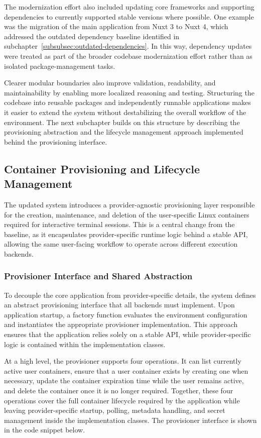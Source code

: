 The modernization effort also included updating core frameworks and supporting dependencies to currently supported stable versions where possible.
One example was the migration of the main application from Nuxt 3 to Nuxt 4, which addressed the outdated dependency baseline identified in subchapter~\ref{subsubsec:outdated-dependencies}.
In this way, dependency updates were treated as part of the broader codebase modernization effort rather than as isolated package-management tasks.

Clearer modular boundaries also improve validation, readability, and maintainability by enabling more localized reasoning and testing.
Structuring the codebase into reusable packages and independently runnable applications makes it easier to extend the system without destabilizing the overall workflow of the environment.
The next subchapter builds on this structure by describing the provisioning abstraction and the lifecycle management approach implemented behind the provisioning interface.

\subsection{Container Provisioning and Lifecycle Management} \label{subsec:container-provisioning-and-lifecycle-management}
The updated system introduces a provider-agnostic provisioning layer responsible for the creation, maintenance, and deletion of the user-specific Linux containers required for interactive terminal sessions.
This is a central change from the baseline, as it encapsulates provider-specific runtime logic behind a stable API, allowing the same user-facing workflow to operate across different execution backends.

\subsubsection{Provisioner Interface and Shared Abstraction} \label{subsubsec:provisioner-interface-and-shared-abstraction}
To decouple the core application from provider-specific details, the system defines an abstract provisioning interface that all backends must implement.
Upon application startup, a factory function evaluates the environment configuration and instantiates the appropriate provisioner implementation.
This approach ensures that the application relies solely on a stable API, while provider-specific logic is contained within the implementation classes.

At a high level, the provisioner supports four operations.
It can list currently active user containers, ensure that a user container exists by creating one when necessary, update the container expiration time while the user remains active, and delete the container once it is no longer required.
Together, these four operations cover the full container lifecycle required by the application while leaving provider-specific startup, polling, metadata handling, and secret management inside the implementation classes.
The provisioner interface is shown in the code snippet below.

